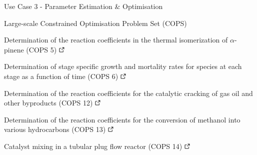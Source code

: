 \documentclass[compress,newPxFont,sthlmFooter]{beamer}
\begin{document}
\begin{frame}[plain]{Use Case 3 - Parameter Estimation \& Optimisation}
    \begin{center}
        {\small
            \alert{Large-scale Constrained Optimisation Problem Set (COPS)}
        }
    \end{center}  
    \begin{itemize}
      {\small
          \item Determination of the reaction coefficients in the thermal isomerization of $\alpha$-pinene (COPS 5)
                \href{http://daetools.com/docs/tutorials-chemeng-optimisation.html\#tutorial-che-opt-2}{\includegraphics[align=b, height=0.8em]{link.png}}
          \item Determination of stage specific growth and mortality rates for species at each stage as a function of time (COPS 6)
                \href{http://daetools.com/docs/tutorials-chemeng-optimisation.html\#tutorial-che-opt-3}{\includegraphics[align=b, height=0.8em]{link.png}}
          \item Determination of the reaction coefficients for the catalytic cracking of gas oil and other byproducts (COPS 12)
                \href{http://daetools.com/docs/tutorials-chemeng-optimisation.html\#tutorial-che-opt-4}{\includegraphics[align=b, height=0.8em]{link.png}}
          \item Determination of the reaction coefficients for the conversion of methanol into various hydrocarbons (COPS 13)
                \href{http://daetools.com/docs/tutorials-chemeng-optimisation.html\#tutorial-che-opt-5}{\includegraphics[align=b, height=0.8em]{link.png}}
          \item Catalyst mixing in a tubular plug flow reactor (COPS 14)
                \href{http://daetools.com/docs/tutorials-chemeng-optimisation.html\#tutorial-che-opt-6}{\includegraphics[align=b, height=0.8em]{link.png}}
      }
    \end{itemize}
\end{frame}
\end{document}
